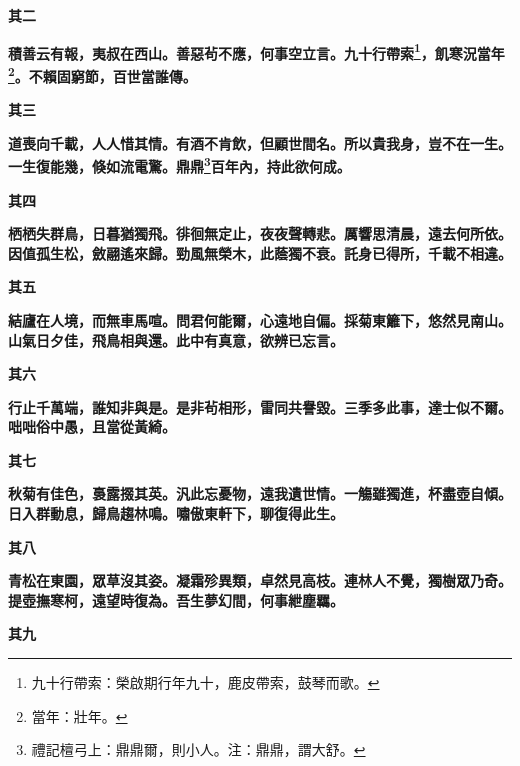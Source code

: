 \begin{quoting}\textbf{其二}\end{quoting}

\textbf{積善云有報，夷叔在西山。善惡茍不應，何事空立言。九十行帶索\footnote{九十行帶索：榮啟期行年九十，鹿皮帶索，鼓琴而歌。}，飢寒況當年\footnote{當年：壯年。}。不賴固窮節，百世當誰傳。}

\begin{quoting}\textbf{其三}\end{quoting}

\textbf{道喪向千載，人人惜其情。有酒不肯飲，但顧世間名。所以貴我身，豈不在一生。一生復能幾，倏如流電驚。鼎鼎\footnote{禮記檀弓上：鼎鼎爾，則小人。注：鼎鼎，謂大舒。}百年內，持此欲何成。}

\begin{quoting}\textbf{其四}\end{quoting}

\textbf{栖栖失群鳥，日暮猶獨飛。徘徊無定止，夜夜聲轉悲。厲響思清晨，遠去何所依。因值孤生松，斂翮遙來歸。勁風無榮木，此蔭獨不衰。託身已得所，千載不相違。}

\begin{quoting}\textbf{其五}\end{quoting}

\textbf{結廬在人境，而無車馬喧。問君何能爾，心遠地自偏。採菊東籬下，悠然見南山。山氣日夕佳，飛鳥相與還。此中有真意，欲辨已忘言。}

\begin{quoting}\textbf{其六}\end{quoting}

\textbf{行止千萬端，誰知非與是。是非茍相形，雷同共譽毀。三季多此事，達士似不爾。咄咄俗中愚，且當從黃綺。}

\begin{quoting}\textbf{其七}\end{quoting}

\textbf{秋菊有佳色，裛露掇其英。汎此忘憂物，遠我遺世情。一觴雖獨進，杯盡壺自傾。日入群動息，歸鳥趨林鳴。嘯傲東軒下，聊復得此生。}

\begin{quoting}\textbf{其八}\end{quoting}

\textbf{青松在東園，眾草沒其姿。凝霜殄異類，卓然見高枝。連林人不覺，獨樹眾乃奇。提壺撫寒柯，遠望時復為。吾生夢幻間，何事紲塵羈。}

\begin{quoting}\textbf{其九}\end{quoting}

